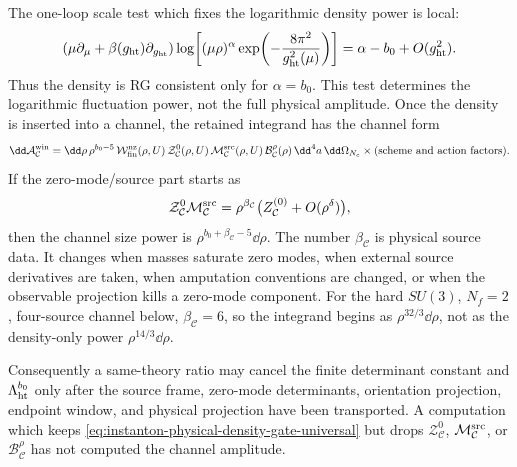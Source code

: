 \begin{controlledapproximation}
\label{ca:instanton-one-loop-density-gate-channel}
The one-loop scale test which fixes the logarithmic density power is local:
\[
  \left(\mu\partial_\mu+\beta(g_{\rm ht})\partial_{g_{\rm ht}}\right)
  \log\!\left[
    (\mu\rho)^\alpha
    \exp\!\left(-\frac{8\pi^2}{g_{\rm ht}^2(\mu)}\right)
  \right]
  =
  \alpha-b_0+O(g_{\rm ht}^2).
\]
Thus the density is RG consistent only for \(\alpha=b_0\).  This test
determines the logarithmic fluctuation power, not the full physical
amplitude.  Once the density is inserted into a channel, the retained
integrand has the channel form
\begin{equation}
  \dd\mathcal A_{\mathcal C}^{\rm win}
  =
  \dd\rho\,
  \rho^{b_0-5}\,
  \mathcal W_{\rm fin}^{\rm nz}(\rho,U)\,
  \mathcal Z_{\mathcal C}^{0}(\rho,U)\,
  \mathcal M_{\mathcal C}^{\rm src}(\rho,U)\,
  \mathcal B_{\mathcal C}^{\rho}(\rho)\,
  \dd^4a\,\dd\Omega_{N_c}
  \times(\hbox{scheme and action factors}).
  \label{eq:instanton-density-gate-channel-integrand}
\end{equation}
If the zero-mode/source part starts as
\[
  \mathcal Z_{\mathcal C}^{0}\mathcal M_{\mathcal C}^{\rm src}
  =
  \rho^{\beta_{\mathcal C}}
  \bigl(Z_{\mathcal C}^{(0)}+O(\rho^\delta)\bigr),
\]
then the channel size power is
\(\rho^{b_0+\beta_{\mathcal C}-5}\dd\rho\).  The number
\(\beta_{\mathcal C}\) is physical source data.  It changes when masses
saturate zero modes, when external source derivatives are taken, when
amputation conventions are changed, or when the observable projection kills a
zero-mode component.  For the hard \(SU(3)\), \(N_f=2\), four-source channel
below, \(\beta_{\mathcal C}=6\), so the integrand begins as
\(\rho^{32/3}\dd\rho\), not as the density-only power
\(\rho^{14/3}\dd\rho\).

Consequently a same-theory ratio may cancel the finite determinant constant
and \(\Lambda_{\rm ht}^{b_0}\) only after the source frame, zero-mode
determinants, orientation projection, endpoint window, and physical
projection have been transported.  A computation which keeps
\eqref{eq:instanton-physical-density-gate-universal} but drops
\(\mathcal Z_{\mathcal C}^{0}\), \(\mathcal M_{\mathcal C}^{\rm src}\), or
\(\mathcal B_{\mathcal C}^{\rho}\) has not computed the channel amplitude.
\end{controlledapproximation}

